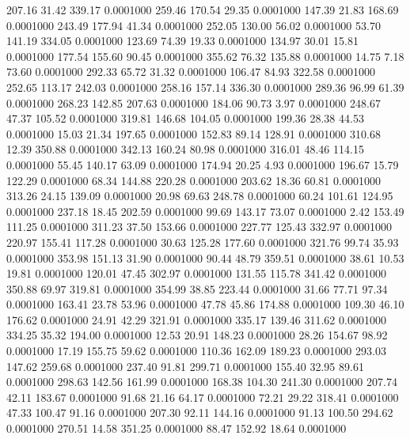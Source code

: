  207.16   31.42  339.17   0.0001000
 259.46  170.54   29.35   0.0001000
 147.39   21.83  168.69   0.0001000
 243.49  177.94   41.34   0.0001000
 252.05  130.00   56.02   0.0001000
  53.70  141.19  334.05   0.0001000
 123.69   74.39   19.33   0.0001000
 134.97   30.01   15.81   0.0001000
 177.54  155.60   90.45   0.0001000
 355.62   76.32  135.88   0.0001000
  14.75    7.18   73.60   0.0001000
 292.33   65.72   31.32   0.0001000
 106.47   84.93  322.58   0.0001000
 252.65  113.17  242.03   0.0001000
 258.16  157.14  336.30   0.0001000
 289.36   96.99   61.39   0.0001000
 268.23  142.85  207.63   0.0001000
 184.06   90.73    3.97   0.0001000
 248.67   47.37  105.52   0.0001000
 319.81  146.68  104.05   0.0001000
 199.36   28.38   44.53   0.0001000
  15.03   21.34  197.65   0.0001000
 152.83   89.14  128.91   0.0001000
 310.68   12.39  350.88   0.0001000
 342.13  160.24   80.98   0.0001000
 316.01   48.46  114.15   0.0001000
  55.45  140.17   63.09   0.0001000
 174.94   20.25    4.93   0.0001000
 196.67   15.79  122.29   0.0001000
  68.34  144.88  220.28   0.0001000
 203.62   18.36   60.81   0.0001000
 313.26   24.15  139.09   0.0001000
  20.98   69.63  248.78   0.0001000
  60.24  101.61  124.95   0.0001000
 237.18   18.45  202.59   0.0001000
  99.69  143.17   73.07   0.0001000
   2.42  153.49  111.25   0.0001000
 311.23   37.50  153.66   0.0001000
 227.77  125.43  332.97   0.0001000
 220.97  155.41  117.28   0.0001000
  30.63  125.28  177.60   0.0001000
 321.76   99.74   35.93   0.0001000
 353.98  151.13   31.90   0.0001000
  90.44   48.79  359.51   0.0001000
  38.61   10.53   19.81   0.0001000
 120.01   47.45  302.97   0.0001000
 131.55  115.78  341.42   0.0001000
 350.88   69.97  319.81   0.0001000
 354.99   38.85  223.44   0.0001000
  31.66   77.71   97.34   0.0001000
 163.41   23.78   53.96   0.0001000
  47.78   45.86  174.88   0.0001000
 109.30   46.10  176.62   0.0001000
  24.91   42.29  321.91   0.0001000
 335.17  139.46  311.62   0.0001000
 334.25   35.32  194.00   0.0001000
  12.53   20.91  148.23   0.0001000
  28.26  154.67   98.92   0.0001000
  17.19  155.75   59.62   0.0001000
 110.36  162.09  189.23   0.0001000
 293.03  147.62  259.68   0.0001000
 237.40   91.81  299.71   0.0001000
 155.40   32.95   89.61   0.0001000
 298.63  142.56  161.99   0.0001000
 168.38  104.30  241.30   0.0001000
 207.74   42.11  183.67   0.0001000
  91.68   21.16   64.17   0.0001000
  72.21   29.22  318.41   0.0001000
  47.33  100.47   91.16   0.0001000
 207.30   92.11  144.16   0.0001000
  91.13  100.50  294.62   0.0001000
 270.51   14.58  351.25   0.0001000
  88.47  152.92   18.64   0.0001000
